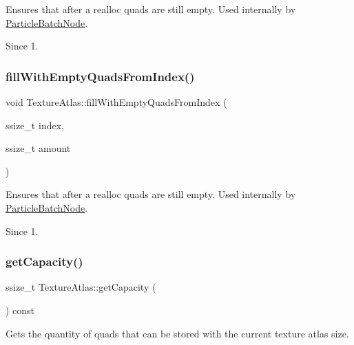 Ensures that after a realloc quads are still empty. Used internally by \hyperlink{classParticleBatchNode}{Particle\+Batch\+Node}. \begin{DoxySince}{Since}
1. 
\end{DoxySince}
\mbox{\label{classTextureAtlas_ac32f2ddd656d12d187a5ad709c74017b}} 
\subsubsection{\texorpdfstring{fill\+With\+Empty\+Quads\+From\+Index()}{fillWithEmptyQuadsFromIndex()}\hspace{0.1cm}{\footnotesize\ttfamily [2/2]}}
{\footnotesize\ttfamily void Texture\+Atlas\+::fill\+With\+Empty\+Quads\+From\+Index (\begin{DoxyParamCaption}\item[{ssize\+\_\+t}]{index,  }\item[{ssize\+\_\+t}]{amount }\end{DoxyParamCaption})}

Ensures that after a realloc quads are still empty. Used internally by \hyperlink{classParticleBatchNode}{Particle\+Batch\+Node}. \begin{DoxySince}{Since}
1. 
\end{DoxySince}
\mbox{\label{classTextureAtlas_a36573b2d198fdf8f8bc118160408ea4b}} 
\subsubsection{\texorpdfstring{get\+Capacity()}{getCapacity()}\hspace{0.1cm}{\footnotesize\ttfamily [1/2]}}
{\footnotesize\ttfamily ssize\+\_\+t Texture\+Atlas\+::get\+Capacity (\begin{DoxyParamCaption}{ }\end{DoxyParamCaption}) const}

Gets the quantity of quads that can be stored with the current texture atlas size. \mbox{\label{classTextureAtlas_a36573b2d198fdf8f8bc118160408ea4b}} 
